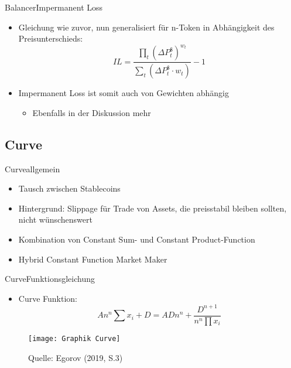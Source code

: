 \documentclass{beamer}
\begin{document}
\begin{frame}{Balancer}{Impermanent Loss}
\begin{itemize}
 \item<1->{Gleichung wie zuvor, nun generalisiert für n-Token
 in Abhängigkeit des Preisunterschieds:
 \begin{equation*}
 IL = \dfrac{\prod_{t}(\Delta P^{\$}_{t})^{w_{t}}}{\sum_{t}(\Delta P^{\$}_{t} \cdot w_{t})}-1
 \end{equation*}
 }
 \item<2->{Impermanent Loss ist somit auch von Gewichten abhängig}
 \begin{itemize}
\item{Ebenfalls in der Diskussion mehr}
 \end{itemize}
\end{itemize}
\end{frame}

\subsection{Curve}

\begin{frame}{Curve}{allgemein}
\begin{itemize}
 \item<1->{Tausch zwischen Stablecoins}
 \item<2->{Hintergrund: Slippage für Trade von Assets, die preisstabil bleiben sollten, nicht wünschenswert}
 \item<3->{Kombination von Constant Sum- und Constant Product-Function}
 \item<4->{Hybrid Constant Function Market Maker}
\end{itemize}
\end{frame}

\begin{frame}{Curve}{Funktionsgleichung}
\begin{itemize}
 \item{Curve Funktion:
 \begin{equation}
 An^n\sum x_{i}+D = ADn^n + \dfrac{D^{n+1}}{n^{n} \prod x_{i}}
 \end{equation}
 }
\end{itemize}
\begin{figure}
\texttt{[image: Graphik Curve]} \caption{\tiny{Quelle: Egorov (2019, S.3)}}
\end{figure} 
\end{frame}
\end{document}

